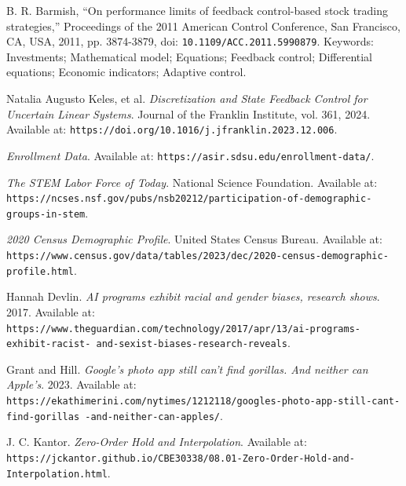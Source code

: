 \documentclass{article}
\begin{document}
\begin{thebibliography}{9}

    B. R. Barmish, 
    \textquotedblleft On performance limits of feedback control-based stock trading strategies,\textquotedblright 
    Proceedings of the 2011 American Control Conference, San Francisco, CA, USA, 2011, pp. 3874-3879, doi: \texttt{10.1109/ACC.2011.5990879}.
    Keywords: Investments; Mathematical model; Equations; Feedback control; Differential equations; Economic indicators; Adaptive control.

    Natalia Augusto Keles, et al. 
    \textit{Discretization and State Feedback Control for Uncertain Linear Systems}. 
    Journal of the Franklin Institute, vol. 361, 2024. 
    Available at: \texttt{https://doi.org/10.1016/j.jfranklin.2023.12.006}.

    \textit{Enrollment Data}. 
    Available at: \texttt{https://asir.sdsu.edu/enrollment-data/}.

    \textit{The STEM Labor Force of Today}. 
    National Science Foundation. 
    Available at: \texttt{https://ncses.nsf.gov/pubs/nsb20212/participation-of-demographic-groups-in-stem}.

    \textit{2020 Census Demographic Profile}. 
    United States Census Bureau. 
    Available at: \texttt{https://www.census.gov/data/tables/2023/dec/2020-census-demographic-profile.html}.

    Hannah Devlin. 
    \textit{AI programs exhibit racial and gender biases, research shows}. 
    2017. 
    Available at: \texttt{https://www.theguardian.com/technology/2017/apr/13/ai-programs-exhibit-racist-
    and-sexist-biases-research-reveals}.

    Grant and Hill. 
    \textit{Google’s photo app still can’t find gorillas. And neither can Apple’s}. 
    2023. 
    Available at: \texttt{https://ekathimerini.com/nytimes/1212118/googles-photo-app-still-cant-find-gorillas
    -and-neither-can-apples/}.

    J. C. Kantor. 
    \textit{Zero-Order Hold and Interpolation}. 
    Available at: \texttt{https://jckantor.github.io/CBE30338/08.01-Zero-Order-Hold-and-Interpolation.html}.
\end{thebibliography}
\end{document}
